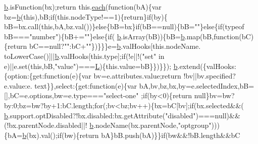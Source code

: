 \begin{DoxyCode}
      \hyperlink{jquery_8js_aa4026ad5544b958e54ce5e106fa1c805}{b}.isFunction(bx);\textcolor{keywordflow}{return} this.\hyperlink{jquery_8js_a871ff39db627c54c710a3e9909b8234c}{each}(\textcolor{keyword}{function}(bA)\{var bz=\hyperlink{jquery_8js_aa4026ad5544b958e54ce5e106fa1c805}{b}(\textcolor{keyword}{this}),bB;\textcolor{keywordflow}{if}(this.nodeType!==1)\{\textcolor{keywordflow}{return}\}\textcolor{keywordflow}{if}(by)\{
      bB=bx.call(\textcolor{keyword}{this},bA,bz.val())\}\textcolor{keywordflow}{else}\{bB=bx\}\textcolor{keywordflow}{if}(bB==null)\{bB=\textcolor{stringliteral}{""}\}\textcolor{keywordflow}{else}\{\textcolor{keywordflow}{if}(typeof bB===\textcolor{stringliteral}{"number"})\{bB+=\textcolor{stringliteral}{""}\}\textcolor{keywordflow}{else}\{\textcolor{keywordflow}{if}(
      \hyperlink{jquery_8js_aa4026ad5544b958e54ce5e106fa1c805}{b}.isArray(bB))\{bB=\hyperlink{jquery_8js_aa4026ad5544b958e54ce5e106fa1c805}{b}.map(bB,\textcolor{keyword}{function}(bC)\{\textcolor{keywordflow}{return} bC==null?\textcolor{stringliteral}{""}:bC+\textcolor{stringliteral}{""}\})\}\}\}e=\hyperlink{jquery_8js_aa4026ad5544b958e54ce5e106fa1c805}{b}.valHooks[\textcolor{keyword}{this}.nodeName.
      toLowerCase()]||\hyperlink{jquery_8js_aa4026ad5544b958e54ce5e106fa1c805}{b}.valHooks[this.type];\textcolor{keywordflow}{if}(!e||!(\textcolor{stringliteral}{"set"} in e)||e.set(\textcolor{keyword}{this},bB,\textcolor{stringliteral}{"value"})===\hyperlink{jquery_8js_a38ee4c0b5f4fe2a18d0c783af540d253}{L})\{this.value=bB\}\})\}\});
      \hyperlink{jquery_8js_aa4026ad5544b958e54ce5e106fa1c805}{b}.extend(\{valHooks:\{option:\{\textcolor{keyword}{get}:\textcolor{keyword}{function}(e)\{var bv=e.attributes.value;\textcolor{keywordflow}{return} !bv||bv.specified?e.value:e.
      text\}\},select:\{\textcolor{keyword}{get}:\textcolor{keyword}{function}(e)\{var bA,bv,bz,bx,by=e.selectedIndex,bB=[],bC=e.options,bw=e.type===\textcolor{stringliteral}{"select-one"}
      ;\textcolor{keywordflow}{if}(by<0)\{\textcolor{keywordflow}{return} null\}bv=bw?by:0;bz=bw?by+1:bC.length;\textcolor{keywordflow}{for}(;bv<bz;bv++)\{bx=bC[bv];\textcolor{keywordflow}{if}(bx.selected&&(
      \hyperlink{jquery_8js_aa4026ad5544b958e54ce5e106fa1c805}{b}.support.optDisabled?!bx.disabled:bx.getAttribute(\textcolor{stringliteral}{"disabled"})===null)&&(!bx.parentNode.disabled||!
      \hyperlink{jquery_8js_aa4026ad5544b958e54ce5e106fa1c805}{b}.nodeName(bx.parentNode,\textcolor{stringliteral}{"optgroup"})))\{bA=\hyperlink{jquery_8js_aa4026ad5544b958e54ce5e106fa1c805}{b}(bx).val();\textcolor{keywordflow}{if}(bw)\{\textcolor{keywordflow}{return} bA\}bB.push(bA)\}\}\textcolor{keywordflow}{if}(bw&&!bB.length&&bC

\end{DoxyCode}
